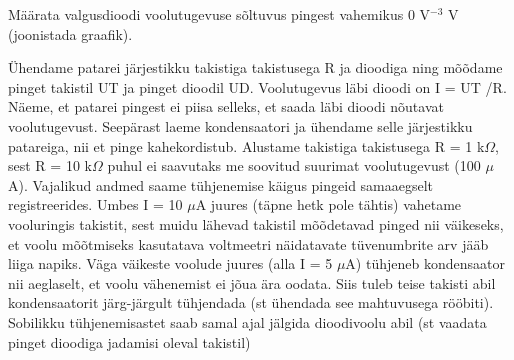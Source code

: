 
Määrata valgusdioodi voolutugevuse sõltuvus pingest vahemikus 0 V$^{-3}$ V (joonistada graafik).

\hint

\solu
Ühendame patarei järjestikku takistiga takistusega R ja dioodiga ning mõõdame pinget takistil UT ja pinget dioodil UD. Voolutugevus läbi dioodi on I = UT /R. Näeme, et patarei pingest ei piisa selleks, et saada läbi dioodi nõutavat voolutugevust. Seepärast laeme kondensaatori ja ühendame selle järjestikku patareiga, nii et pinge kahekordistub. Alustame takistiga takistusega R = 1 k$\Omega$, sest R = 10 k$\Omega$ puhul ei saavutaks me soovitud suurimat voolutugevust (100 $\mu$A). Vajalikud andmed saame tühjenemise käigus pingeid samaaegselt registreerides. Umbes I = 10 $\mu$A juures (täpne hetk pole tähtis) vahetame vooluringis takistit, sest muidu lähevad takistil mõõdetavad pinged nii väikeseks, et voolu mõõtmiseks kasutatava voltmeetri näidatavate tüvenumbrite arv jääb liiga napiks. Väga väikeste voolude juures (alla I = 5 $\mu$A) tühjeneb kondensaator nii aeglaselt, et voolu vähenemist ei jõua ära oodata. Siis tuleb teise takisti abil kondensaatorit järg-järgult tühjendada (st ühendada see mahtuvusega rööbiti). Sobilikku tühjenemisastet saab samal ajal jälgida dioodivoolu abil (st vaadata pinget dioodiga jadamisi oleval takistil)
\probend
